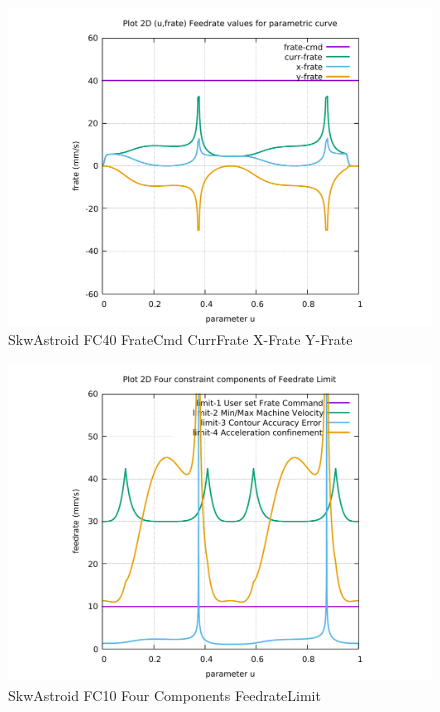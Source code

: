 \begin{figure}
	\caption     {SkwAstroid FC40 FrateCmd CurrFrate X-Frate Y-Frate}
	\label{30-img-SkwAstroid-FC40-FrateCmd-CurrFrate-X-Frate-Y-Frate.pdf}
	\includegraphics[width=1.00\textwidth]{Chap4/appendix/app-SkwAstroid/plots/30-img-SkwAstroid-FC40-FrateCmd-CurrFrate-X-Frate-Y-Frate.pdf}
\end{figure}


\clearpage
\pagebreak

\begin{figure}
	\caption     {SkwAstroid FC10 Four Components FeedrateLimit}
	\label{31-img-SkwAstroid-FC10-Four-Components-FeedrateLimit.pdf}
	\includegraphics[width=1.00\textwidth]{Chap4/appendix/app-SkwAstroid/plots/31-img-SkwAstroid-FC10-Four-Components-FeedrateLimit.pdf}
\end{figure}


